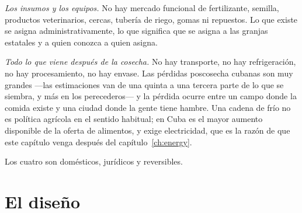 \emph{Los insumos y los equipos.} No hay mercado funcional de fertilizante, semilla, productos
veterinarios, cercas, tubería de riego, gomas ni repuestos. Lo que existe se asigna
administrativamente, lo que significa que se asigna a las granjas estatales y a quien conozca
a quien asigna.

\emph{Todo lo que viene después de la cosecha.} No hay transporte, no hay refrigeración, no
hay procesamiento, no hay envase. Las pérdidas poscosecha cubanas son muy grandes ---las
estimaciones van de una quinta a una tercera parte de lo que se siembra, y más en los
perecederos--- y la pérdida ocurre entre un campo donde la comida existe y una ciudad donde la
gente tiene hambre.\unv{} Una cadena de frío no es política agrícola en el sentido habitual;
en Cuba es el mayor aumento disponible de la oferta de alimentos, y exige electricidad, que es
la razón de que este capítulo venga después del capítulo~\ref{ch:energy}.

Los cuatro son domésticos, jurídicos y reversibles.

\section{El diseño}

